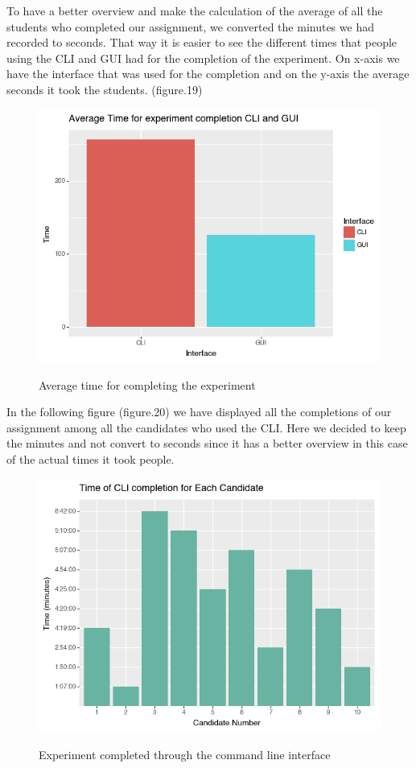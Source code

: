 \documentclass[]{report}
\begin{document}
	To have a better overview and make the calculation of the average of all the students who completed our assignment, we converted the minutes we had recorded to seconds. That way it is easier to see the different times that people using the CLI and GUI had for the completion of the experiment. On x-axis we have the interface that was used for the completion and on the y-axis the average seconds it took the students. (figure.19)
\begin{figure}[H]
	\centering
	\includegraphics[width=0.75\linewidth]{ExperimentAverageTime}\\
	\caption{Average time for completing the experiment}
	\label{fig: 19}
\end{figure}


In the following figure (figure.20) we have displayed all the completions of our assignment among all the candidates who used the CLI. Here we decided to keep the minutes and not convert to seconds since it has a better overview in this case of the actual times it took people.


\begin{figure}[H]
	\centering
	\includegraphics[width=0.75\linewidth]{ExperimentCli}\\
	\caption{Experiment completed through the command line interface}
	\label{fig: 20}
\end{figure}
\end{document}
